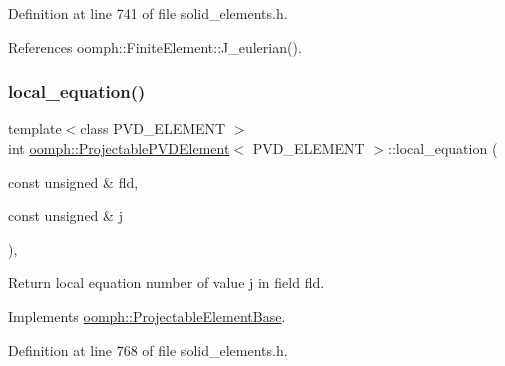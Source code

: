 Definition at line 741 of file solid\+\_\+elements.\+h.



References oomph\+::\+Finite\+Element\+::\+J\+\_\+eulerian().

\mbox{\label{classoomph_1_1ProjectablePVDElement_acd838813683d89c331dab13ba6d5726a}} 
\subsubsection{\texorpdfstring{local\+\_\+equation()}{local\_equation()}}
{\footnotesize\ttfamily template$<$class P\+V\+D\+\_\+\+E\+L\+E\+M\+E\+NT $>$ \\
int \hyperlink{classoomph_1_1ProjectablePVDElement}{oomph\+::\+Projectable\+P\+V\+D\+Element}$<$ P\+V\+D\+\_\+\+E\+L\+E\+M\+E\+NT $>$\+::local\+\_\+equation (\begin{DoxyParamCaption}\item[{const unsigned \&}]{fld,  }\item[{const unsigned \&}]{j }\end{DoxyParamCaption})\hspace{0.3cm}{\ttfamily [inline]}, {\ttfamily [virtual]}}



Return local equation number of value j in field fld. 



Implements \hyperlink{classoomph_1_1ProjectableElementBase_ac5c27ae929ff636dc7747fe23fd4f738}{oomph\+::\+Projectable\+Element\+Base}.



Definition at line 768 of file solid\+\_\+elements.\+h.

\mbox{\label{classoomph_1_1ProjectablePVDElement_a3ef16d41268f4cdb67718a5c2fca3cab}} 
